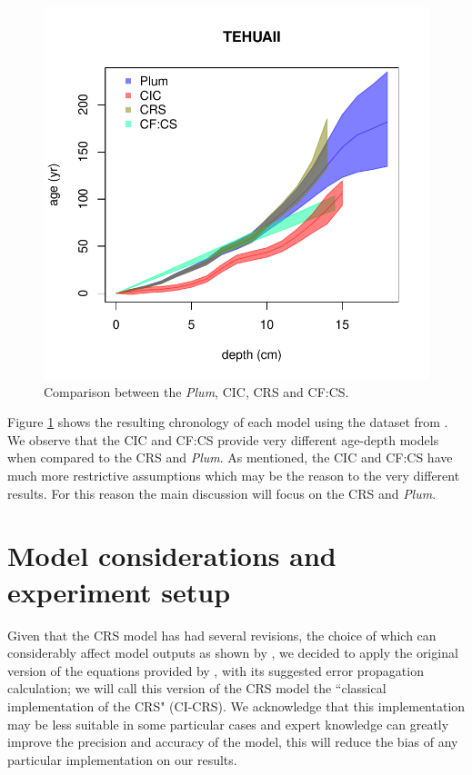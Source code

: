 \documentclass [10pt] {article}
\begin{document}
\begin{figure}[h!]
 \centering
	\includegraphics[width=.75\linewidth]{TEHUAII.pdf}
	\caption{Comparison between the \textit{Plum}, CIC, CRS and CF:CS.} 
  \label{fig:tehuaii}
\end{figure}

Figure \ref{fig:tehuaii} shows the resulting chronology of each model using the dataset from \citet{Sanchez-Cabeza2012}. 
We observe that the CIC and CF:CS provide very different age-depth models when compared to the CRS and \textit{Plum}. 
As mentioned, the CIC and CF:CS have much more restrictive assumptions which may be the reason to the very different results.
For this reason the main discussion will focus on the CRS and \textit{Plum}.



\section{Model considerations and experiment setup}

Given that the CRS model has had several revisions, the choice of which can considerably affect model outputs as shown by \citet{Barsanti2020}, we decided to apply the original version of the equations provided by \citet{Appleby2001}, with its suggested error propagation calculation; we will call this version of the CRS model the ``classical implementation of the CRS" (CI-CRS). 
We acknowledge that this implementation may be less suitable in some particular cases and expert knowledge can greatly improve the precision and accuracy of the model, this will reduce the bias of any particular implementation on our results.
\end{document}
